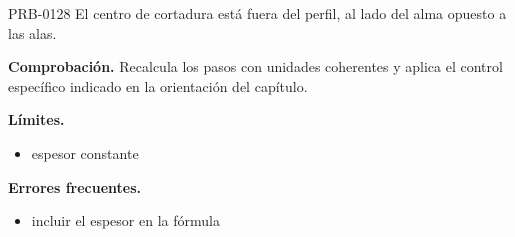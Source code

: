 \begin{studiumworked}{PRB-0128}
El centro de cortadura está fuera del perfil, al lado del alma opuesto a las alas.

\par\textbf{Comprobación.} Recalcula los pasos con unidades coherentes y aplica el control específico indicado en la orientación del capítulo.

\textbf{Límites.}\begin{itemize}\item espesor constante\end{itemize}

\textbf{Errores frecuentes.}\begin{itemize}\item incluir el espesor en la fórmula\end{itemize}

\end{studiumworked}

\Needspace{.3\textheight}

